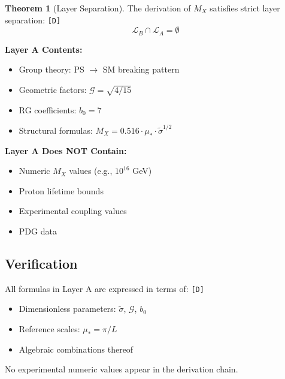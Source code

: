 \documentclass[11pt,a4paper]{article}
\newcommand{\tagD}{\textcolor{green!50!black}{\texttt{[D]}}}
\theoremstyle{definition}
\newtheorem{theorem}{Theorem}[section]
\begin{document}
\begin{nobackflowbox}
\begin{theorem}[Layer Separation]
\label{thm:no-backflow}
The derivation of $M_X$ satisfies strict layer separation: \tagD{}
\begin{equation}
\label{eq:no-backflow}
\boxed{\mathcal{L}_B \cap \mathcal{L}_A = \emptyset}
\end{equation}

\textbf{Layer A Contents:}
\begin{itemize}
  \item Group theory: PS $\to$ SM breaking pattern
  \item Geometric factors: $\mathcal{G} = \sqrt{4/15}$
  \item RG coefficients: $b_0 = 7$
  \item Structural formulas: $M_X = 0.516 \cdot \mu_* \cdot \tilde{\sigma}^{1/2}$
\end{itemize}

\textbf{Layer A Does NOT Contain:}
\begin{itemize}
  \item[$\times$] Numeric $M_X$ values (e.g., $10^{16}$ GeV)
  \item[$\times$] Proton lifetime bounds
  \item[$\times$] Experimental coupling values
  \item[$\times$] PDG data
\end{itemize}
\end{theorem}
\end{nobackflowbox}

\subsection{Verification}
\label{subsec:backflow-verification}

All formulas in Layer A are expressed in terms of: \tagD{}
\begin{itemize}
  \item Dimensionless parameters: $\tilde{\sigma}$, $\mathcal{G}$, $b_0$
  \item Reference scales: $\mu_* = \pi/L$
  \item Algebraic combinations thereof
\end{itemize}

No experimental numeric values appear in the derivation chain.

\end{document}
